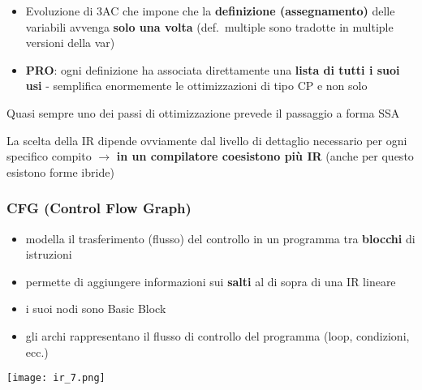 \begin{itemize}
  \item Evoluzione di 3AC che impone che la \textbf{definizione (assegnamento)} delle variabili avvenga \textbf{solo una volta} (def.~multiple sono tradotte in multiple versioni della var)
  \item \textbf{PRO}: ogni definizione ha associata direttamente una \textbf{lista di tutti i suoi usi} - semplifica enormemente le ottimizzazioni di tipo CP e non solo
\end{itemize}


\begin{emphasize}
  Quasi sempre uno dei passi di ottimizzazione prevede il passaggio a forma SSA
\end{emphasize}

\begin{emphasize}
  La scelta della IR dipende ovviamente dal livello di dettaglio necessario per ogni specifico compito $\rightarrow$ \textbf{in un compilatore coesistono pi\`u IR} (anche per questo esistono forme ibride)
\end{emphasize}

\subsubsection{CFG (Control Flow Graph)}

\noindent\begin{minipage}[c]{.65\textwidth}
\begin{itemize}
  \item modella il trasferimento (flusso) del controllo in un programma tra \textbf{blocchi} di istruzioni
  \item permette di aggiungere informazioni sui \textbf{salti} al di sopra di una IR lineare
  \item i suoi nodi sono Basic Block
  \item gli archi rappresentano il flusso di controllo del programma (loop, condizioni, ecc.)
\end{itemize}
\end{minipage}
\begin{minipage}[c]{.35\textwidth}
\texttt{[image: ir\_7.png]}
\end{minipage}

